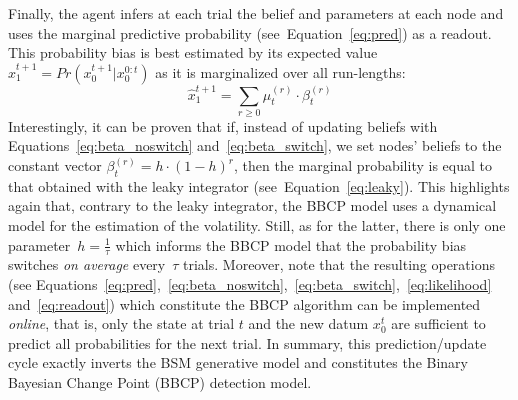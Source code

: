 \documentclass[10pt,letterpaper]{article}
\newcommand{\eql}[1]{\begin{equation}#1\end{equation}}
\DeclareMathOperator{\argmax}{argmax}
\newcommand{\seeEq}[1]{Equation~\ref{eq:#1}}
\begin{document}
Finally, the agent infers at each trial the belief and parameters at each node
and uses the marginal predictive probability (see~\seeEq{pred}) as a readout.
This probability bias is best estimated by its expected value $\hat{x}_1^{t+1}=Pr(x_0^{t+1} | x_0^{0:t})$
as it is marginalized over all run-lengths:
\eql{
\hat{x}_1^{t+1} = \sum_{r \geq 0} \mu^{(r)}_{t} \cdot \beta^{(r)}_{t}
\label{eq:readout}
}
Interestingly, it can be proven that if,
instead of updating beliefs with Equations~\ref{eq:beta_noswitch} and~\ref{eq:beta_switch},
we set nodes' beliefs to the constant vector $\beta^{(r)}_t = h \cdot (1 -h) ^r$,
then the marginal probability is equal to that obtained with the leaky integrator (see~\seeEq{leaky}).
This highlights again that, contrary to the leaky integrator, %
the BBCP model uses a dynamical model for the estimation of the volatility.
Still, as for the latter, there is only one parameter~$h=\frac 1 \tau$ which informs the BBCP model
that the probability bias switches \emph{on average} every~$\tau$ trials.
Moreover, note that the resulting operations
(see Equations~\ref{eq:pred},~\ref{eq:beta_noswitch},~\ref{eq:beta_switch},~\ref{eq:likelihood} and~\ref{eq:readout})
which constitute the BBCP algorithm
can be implemented \textit{online}, that is,
only the state at trial $t$ and the new datum $x_0^t$
are sufficient to predict all probabilities for the next trial.
In summary, this prediction/update cycle exactly inverts the BSM generative model %
and constitutes the Binary Bayesian Change Point (BBCP) detection model.
%
\end{document}
